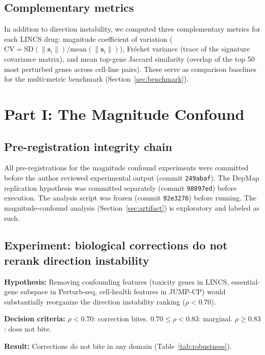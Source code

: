 \documentclass[11pt]{article}
\begin{document}
\subsection{Complementary metrics}

In addition to direction instability, we computed three complementary
metrics for each LINCS drug: magnitude coefficient of variation
($\text{CV} = \text{SD}(\|\mathbf{s}_i\|) / \text{mean}(\|\mathbf{s}_i\|)$),
Fr\'{e}chet variance (trace of the signature covariance matrix), and
mean top-gene Jaccard similarity (overlap of the top 50 most perturbed
genes across cell-line pairs). These serve as comparison baselines for
the multi-metric benchmark (Section~\ref{sec:benchmark}).


\section{Part I: The Magnitude Confound}

\subsection{Pre-registration integrity chain}

All pre-registrations for the magnitude confound experiments were
committed before the author reviewed experimental output (commit
\texttt{249abaf}). The DepMap replication hypothesis was committed
separately (commit \texttt{98897ed}) before execution. The analysis
script was frozen (commit \texttt{92e3276}) before running. The
magnitude-confound analysis (Section~\ref{sec:artifact}) is exploratory
and labeled as such.

\subsection{Experiment: biological corrections do not rerank direction instability}

\textbf{Hypothesis:} Removing confounding features (toxicity genes in
LINCS, essential-gene subspace in Perturb-seq, cell-health features in
JUMP-CP) would substantially reorganize the direction instability ranking
($\rho < 0.70$).

\textbf{Decision criteria:} $\rho < 0.70$: correction bites.
$0.70 \leq \rho < 0.83$: marginal. $\rho \geq 0.83$: does not bite.

\textbf{Result:} Corrections do not bite in any domain (Table~\ref{tab:robustness}).
\end{document}
